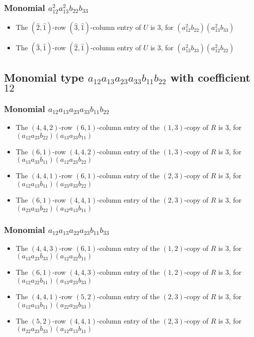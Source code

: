 \documentclass{article}
\begin{document}
\subsubsection{Monomial $ a_{12}^{2} a_{13}^{2} b_{22} b_{33} $}

\begin{itemize}
\item The $(\hat{2}, \hat{1})$-row $(\hat{3}, \hat{1})$-column entry of $U$ is $3$, for $( a_{12}^{2} b_{22} )( a_{13}^{2} b_{33} )$ 
\item The $(\hat{3}, \hat{1})$-row $(\hat{2}, \hat{1})$-column entry of $U$ is $3$, for $( a_{13}^{2} b_{33} )( a_{12}^{2} b_{22} )$ 
\end{itemize}
\subsection{Monomial type $ a_{12} a_{13} a_{23} a_{33} b_{11} b_{22} $ with coefficient $ 12 $}

\subsubsection{Monomial $ a_{12} a_{13} a_{23} a_{33} b_{11} b_{22} $}

\begin{itemize}
\item The $(4, 4, 2)$-row $(6, 1)$-column entry of the $ \left(1, 3\right) $-copy of $R$ is $ 3 $, for $( a_{12} a_{23} b_{22} )( a_{13} a_{33} b_{11} )$ 
\item The $(6, 1)$-row $(4, 4, 2)$-column entry of the $ \left(1, 3\right) $-copy of $R$ is $ 3 $, for $( a_{13} a_{33} b_{11} )( a_{12} a_{23} b_{22} )$ 
\item The $(4, 4, 1)$-row $(6, 1)$-column entry of the $ \left(2, 3\right) $-copy of $R$ is $ 3 $, for $( a_{12} a_{13} b_{11} )( a_{23} a_{33} b_{22} )$ 
\item The $(6, 1)$-row $(4, 4, 1)$-column entry of the $ \left(2, 3\right) $-copy of $R$ is $ 3 $, for $( a_{23} a_{33} b_{22} )( a_{12} a_{13} b_{11} )$ 
\end{itemize}
\subsubsection{Monomial $ a_{12} a_{13} a_{22} a_{23} b_{11} b_{33} $}

\begin{itemize}
\item The $(4, 4, 3)$-row $(6, 1)$-column entry of the $ \left(1, 2\right) $-copy of $R$ is $ 3 $, for $( a_{13} a_{23} b_{33} )( a_{12} a_{22} b_{11} )$ 
\item The $(6, 1)$-row $(4, 4, 3)$-column entry of the $ \left(1, 2\right) $-copy of $R$ is $ 3 $, for $( a_{12} a_{22} b_{11} )( a_{13} a_{23} b_{33} )$ 
\item The $(4, 4, 1)$-row $(5, 2)$-column entry of the $ \left(2, 3\right) $-copy of $R$ is $ 3 $, for $( a_{12} a_{13} b_{11} )( a_{22} a_{23} b_{33} )$ 
\item The $(5, 2)$-row $(4, 4, 1)$-column entry of the $ \left(2, 3\right) $-copy of $R$ is $ 3 $, for $( a_{22} a_{23} b_{33} )( a_{12} a_{13} b_{11} )$ 
\end{itemize}
\end{document}
